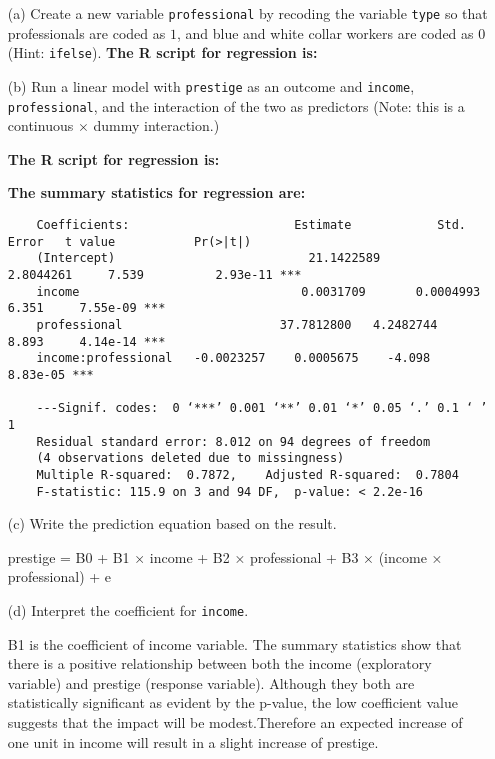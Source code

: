 \documentclass[12pt,letterpaper]{article}
\begin{document}
\newpage
\begin{enumerate}
	
	\item [(a)]
	Create a new variable \texttt{professional} by recoding the variable \texttt{type} so that professionals are coded as $1$, and blue and white collar workers are coded as $0$ (Hint: \texttt{ifelse}).
	\textbf{		The R script for regression is:}		  
	\vspace{1cm}
	
	
	\item [(b)]
	Run a linear model with \texttt{prestige} as an outcome and \texttt{income}, \texttt{professional}, and the interaction of the two as predictors (Note: this is a continuous $\times$ dummy interaction.)
	
	\textbf{		The R script for regression is:}	  
	
	\textbf{		The summary statistics for regression are:}
	\begin{verbatim}
	Coefficients:         				Estimate		   	Std. Error   t value 		   Pr(>|t|)         
	(Intercept)         				  21.1422589		  2.8044261     7.539 		   2.93e-11 ***
	income               				 0.0031709  	 0.0004993   	 6.351 	   7.55e-09 ***
	professional        			  37.7812800   4.2482744   	 8.893 	   4.14e-14 ***
	income:professional   -0.0023257    0.0005675  	 -4.098 	   8.83e-05 ***

	---Signif. codes:  0 ‘***’ 0.001 ‘**’ 0.01 ‘*’ 0.05 ‘.’ 0.1 ‘ ’ 1
	Residual standard error: 8.012 on 94 degrees of freedom  
	(4 observations deleted due to missingness)
	Multiple R-squared:  0.7872,	Adjusted R-squared:  0.7804 
	F-statistic: 115.9 on 3 and 94 DF,  p-value: < 2.2e-16
	\end{verbatim} 
	\vspace{1cm}
	\item [(c)]
	Write the prediction equation based on the result.
	\item[] prestige = B0 + B1 × income + B2 × professional + B3 × (income × professional) + e
	\vspace{2cm}
	\item [(d)]
	Interpret the coefficient for \texttt{income}.
	
	\item[] B1 is the coefficient of income variable. The summary statistics show that there is a positive relationship between both the income (exploratory variable) and
	prestige (response variable). Although they both are statistically significant
	as evident by the p-value, the low coefficient value suggests that the impact
	will be modest.Therefore an expected increase of one unit in  income will 
	result in a slight increase of prestige. 
	

\end{enumerate}
\end{document}
